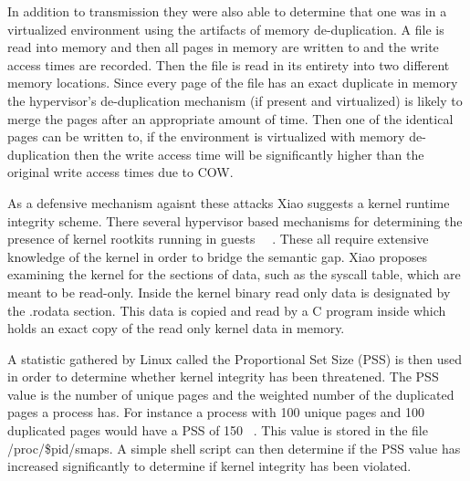 In addition to transmission they were also able to determine that one was in a virtualized environment using the artifacts of memory de-duplication. A file is read into memory and then all pages in memory are written to and the write access times are recorded. Then the file is read in its entirety into two different memory locations. Since every page of the file has an exact duplicate in memory the hypervisor’s de-duplication mechanism (if present and virtualized) is likely to merge the pages after an appropriate amount of time. Then one of the identical pages can be written to, if the environment is virtualized with memory de-duplication then the write access time will be significantly higher than the original write access times due to COW. 








As a defensive mechanism agaisnt these attacks Xiao suggests a kernel runtime integrity scheme.  There several hypervisor based mechanisms for determining the presence of kernel rootkits running in guests ~\cite{butler_windows_2005}~\cite{hoglund_*real*_1999}. These all require extensive knowledge of the kernel in order to bridge the semantic gap. Xiao proposes examining the kernel for the sections of data, such as the syscall table, which are meant to be read-only. Inside the kernel binary read only data is designated by the .rodata section. This data is copied and read by a C program inside which holds an exact copy of the read only kernel data in memory. 

A statistic gathered by Linux called the Proportional Set Size (PSS) is then used in order to determine whether kernel integrity has been threatened. The PSS value is the number of unique pages and the weighted number of the duplicated pages a process has. For instance a process with 100 unique pages and 100 duplicated pages would have a PSS of 150 ~\cite{xiao_security_2013}. This value is stored in the file /proc/\$pid/smaps. A simple shell script can then determine if the PSS value has increased significantly to determine if kernel integrity has been violated. 

